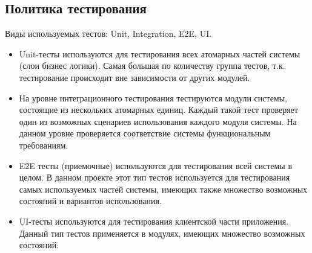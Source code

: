 \documentclass[implementation.tex]{subfiles}
\begin{document}
  \subsection{Политика тестирования}
  \par
  Виды используемых тестов: Unit, Integration, E2E, UI.
  \begin{itemize}
    \item Unit-тесты используются для тестирования всех атомарных частей системы (слои бизнес логики). Самая большая по количеству группа тестов, т.к. тестирование происходит вне зависимости от других модулей.
    \item На уровне интеграционного тестирования тестируются модули системы, состоящие из нескольких атомарных единиц. Каждый такой тест проверяет один из возможных сценариев использования каждого модуля системы. На данном уровне проверяется соответствие системы функциональным требованиям.
    \item E2E тесты (приемочные) используются для тестирования всей системы в целом. В данном проекте этот тип тестов используется для тестирования самых используемых частей системы, имеющих также множество возможных состояний и вариантов использования.
    \item UI-тесты используются для тестирования клиентской части приложения. Данный тип тестов применяется в модулях, имеющих множество возможных состояний.
  \end{itemize}
\end{document}

